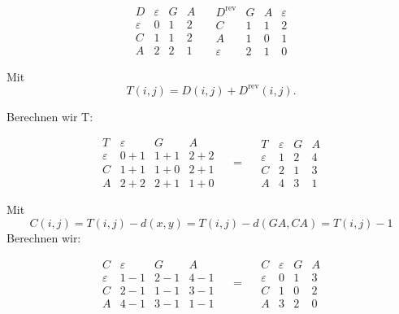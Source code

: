 \[
    \begin{array}{c|ccc}
        D & \varepsilon & G & A \\\hline
        \varepsilon & 0&1&2\\
        C&1&1&2\\
        A&2&2&1
    \end{array}
    \quad
    \begin{array}{c|ccc}
        D^{\mathrm{rev}} & G&A&\varepsilon\\\hline
        C & 1&1&2\\
        A&1&0&1\\
        \varepsilon&2&1&0
    \end{array}
\]

Mit
\[
    T(i,j) = D(i,j) + D^{\mathrm{rev}}(i,j).
\]

Berechnen wir T:

\[
    \begin{array}{c|ccc}
        T & \varepsilon & G & A \\\hline
        \varepsilon & 0+1&1+1&2+2\\
        C&1+1&1+0&2+1\\
        A&2+2&2+1&1+0
    \end{array}
    \quad = \quad
    \begin{array}{c|ccc}
        T & \varepsilon & G & A \\\hline
        \varepsilon & 1&2&4\\
        C&2&1&3\\
        A&4&3&1
    \end{array}
\]

Mit
\[
    C(i, j) = T (i, j) - d(x, y) = T (i, j) - d(GA,CA) = T (i, j) - 1
\]
Berechnen wir:

\[
    \begin{array}{c|ccc}
        C & \varepsilon & G & A \\\hline
        \varepsilon & 1-1&2-1&4-1\\
        C&2-1&1-1&3-1\\
        A&4-1&3-1&1-1
    \end{array}
    \quad = \quad
    \begin{array}{c|ccc}
        C & \varepsilon & G & A \\\hline
        \varepsilon & 0&1&3\\
        C&1&0&2\\
        A&3&2&0
    \end{array}
\]

